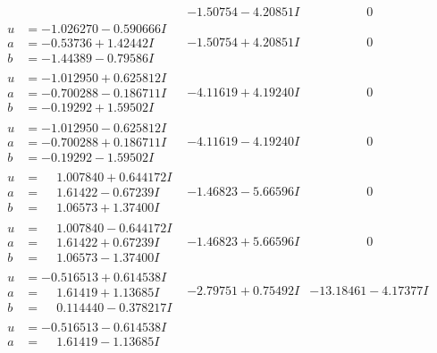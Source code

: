 \documentclass[1p]{elsarticle_modified}
\theoremstyle{definition}
\begin{document}
$$\begin{array}{c|c|c}
 & -1.50754 - 4.20851 I & \phantom{-0.000000 } 0 \\ \hline\begin{aligned}
u &= -1.026270 - 0.590666 I \\
a &= -0.53736 + 1.42442 I \\
b &= -1.44389 - 0.79586 I\end{aligned}
 & -1.50754 + 4.20851 I & \phantom{-0.000000 } 0 \\ \hline\begin{aligned}
u &= -1.012950 + 0.625812 I \\
a &= -0.700288 - 0.186711 I \\
b &= -0.19292 + 1.59502 I\end{aligned}
 & -4.11619 + 4.19240 I & \phantom{-0.000000 } 0 \\ \hline\begin{aligned}
u &= -1.012950 - 0.625812 I \\
a &= -0.700288 + 0.186711 I \\
b &= -0.19292 - 1.59502 I\end{aligned}
 & -4.11619 - 4.19240 I & \phantom{-0.000000 } 0 \\ \hline\begin{aligned}
u &= \phantom{-}1.007840 + 0.644172 I \\
a &= \phantom{-}1.61422 - 0.67239 I \\
b &= \phantom{-}1.06573 + 1.37400 I\end{aligned}
 & -1.46823 - 5.66596 I & \phantom{-0.000000 } 0 \\ \hline\begin{aligned}
u &= \phantom{-}1.007840 - 0.644172 I \\
a &= \phantom{-}1.61422 + 0.67239 I \\
b &= \phantom{-}1.06573 - 1.37400 I\end{aligned}
 & -1.46823 + 5.66596 I & \phantom{-0.000000 } 0 \\ \hline\begin{aligned}
u &= -0.516513 + 0.614538 I \\
a &= \phantom{-}1.61419 + 1.13685 I \\
b &= \phantom{-}0.114440 - 0.378217 I\end{aligned}
 & -2.79751 + 0.75492 I & -13.18461 - 4.17377 I \\ \hline\begin{aligned}
u &= -0.516513 - 0.614538 I \\
a &= \phantom{-}1.61419 - 1.13685 I \\

\end{aligned}
\end{array}$$
\end{document}
